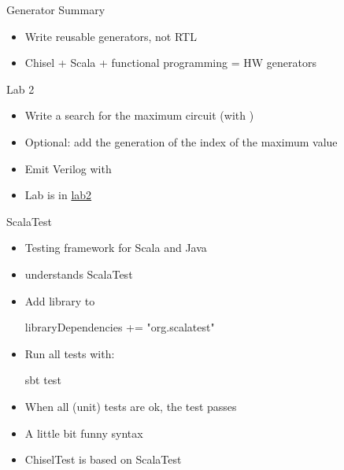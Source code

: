 \begin{frame}[fragile]{Generator Summary}
\begin{itemize}
\item Write reusable generators, not RTL
\item Chisel + Scala + functional programming = HW generators
\end{itemize}
\end{frame}


\begin{frame}[fragile]{Lab 2}
\begin{itemize}
\item Write a search for the maximum circuit (with )
\item Optional: add the generation of the index of the maximum value
\item Emit Verilog with  %
\item Lab is in \href{https://github.com/schoeberl/agile-hw/tree/main/lab2}{lab2}
\end{itemize}
\end{frame}



\begin{frame}[fragile]{ScalaTest}
\begin{itemize}
\item Testing framework for Scala and Java
\item {} understands ScalaTest
\item Add library to 
\begin{chisel}
libraryDependencies += "org.scalatest" %
\end{chisel}
\item Run all tests with:
\begin{chisel}
sbt test
\end{chisel}
\item When all (unit) tests are ok, the test passes
\item A little bit funny syntax
\item ChiselTest is based on ScalaTest
\end{itemize}
\end{frame}

